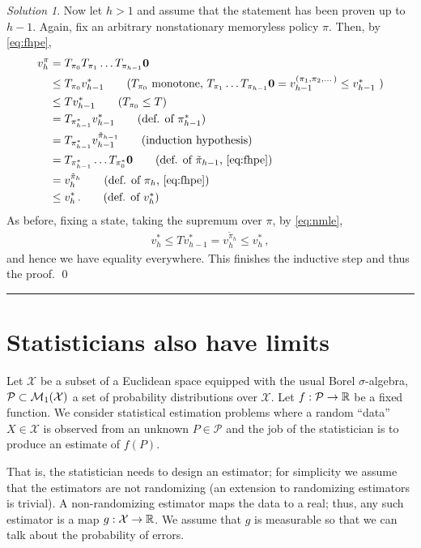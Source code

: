 \documentclass{article}
\newcommand{\cP}{\mathcal{P}}
\newcommand{\cX}{\mathcal{X}}
\DeclareMathOperator*{\1}{\mathbbm{1}}
\newcommand{\0}{\mathbf{0}}
\theoremstyle{definition}
\theoremstyle{remark}
\newtheorem*{solution*}{Solution}
\theoremstyle{theorem}
\begin{document}
\begin{solution*}
Now let $h>1$ and assume that the statement has been proven up to $h-1$.
Again, fix an arbitrary nonstationary memoryless policy $\pi$. Then, by \cref{eq:fhpe},
\begin{align*}
v_h^\pi 
& = T_{\pi_0} T_{\pi_1} \dots T_{\pi_{h-1}} \boldsymbol{0} \\
& \le T_{\pi_0} v_{h-1}^*  \tag{$T_{\pi_0}$ monotone, $T_{\pi_1} \dots T_{\pi_{h-1}} \boldsymbol{0} =v_{h-1}^{(\pi_1,\pi_2,\dots)} \le v_{h-1}^*$ } \\
& \le T v_{h-1}^*  \tag{$T_{\pi_0}\le T$}\\
& = T_{\pi_{h-1}^*} v_{h-1}^* \tag{def. of $\pi_{h-1}^*$}\\
& = T_{\pi_{h-1}^*} v_{h-1}^{\tilde \pi_{h-1}}  \tag{induction hypothesis}\\
& = T_{\pi_{h-1}^*} \dots T_{\pi_0^*} \boldsymbol{0} \tag{def. of $\tilde \pi_{h-1}$, \cref{eq:fhpe}}\\
& = v_h^{\tilde \pi_h}  \tag{def. of $\pi_h$, \cref{eq:fhpe}} \\
& \le v^*_h\,. \tag{def. of $v^*_h$}
\end{align*}
As before, fixing a state, taking the supremum over $\pi$, by \cref{eq:nmle},
\begin{align*}
v_h^* \le T v_{h-1}^* = v_h^{\tilde \pi_h} \le v_h^*\,,
\end{align*}
and hence we have equality everywhere. This finishes the inductive step and thus the proof.
\qed\par\smallskip\hrule
\end{solution*}


\section*{Statisticians also have limits}
Let $\cX$ be a subset of a Euclidean space equipped with the usual Borel $\sigma$-algebra, 
$\cP\subset \cM_1(\cX)$ a set of probability distributions over $\cX$.
Let $f:\cP \to \RR$ be a fixed function.
We consider statistical estimation problems where a random ``data'' $X\in \cX$ is observed
from an unknown $P\in \cP$
and the job of the statistician is to produce an estimate of $f(P)$.

That is, the statistician needs to design an estimator; for simplicity we assume that the estimators are not randomizing (an extension to randomizing estimators is trivial).
A non-randomizing estimator maps the data to a real; thus, any such estimator is a map $g:\cX \to \RR$.
We assume that $g$ is measurable so that we can talk about the probability of errors.
\end{document}
